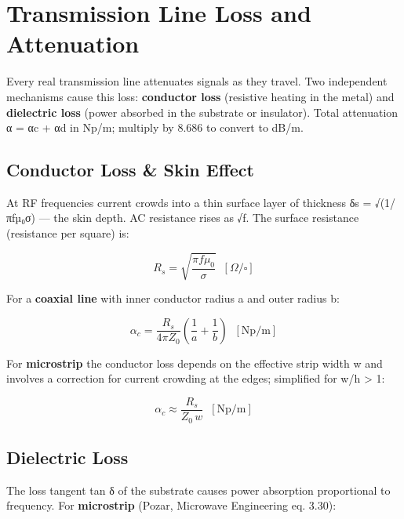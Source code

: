 \section{Transmission Line Loss and Attenuation}\label{sec:wiki_tl_loss}



Every real transmission line attenuates signals as they travel. Two independent mechanisms cause this loss: \textbf{conductor loss} (resistive heating in the metal) and \textbf{dielectric loss} (power absorbed in the substrate or insulator). Total attenuation α = αc + αd in Np/m; multiply by 8.686 to convert to dB/m.

				

\subsection{Conductor Loss \& Skin Effect}

				

At RF frequencies current crowds into a thin surface layer of thickness δs = √(1/πfµ₀σ) — the skin depth. AC resistance rises as √f. The surface resistance (resistance per square) is:

				
\[R_s = \sqrt{\dfrac{\pi f \mu_0}{\sigma}}\;\;[\Omega/\square]\]

				

For a \textbf{coaxial line} with inner conductor radius a and outer radius b:

				
\[\alpha_c = \dfrac{R_s}{4\pi Z_0}\!\left(\dfrac{1}{a}+\dfrac{1}{b}\right)\;\;[\text{Np/m}]\]

				

For \textbf{microstrip} the conductor loss depends on the effective strip width w and involves a correction for current crowding at the edges; simplified for w/h \textgreater{} 1:

				
\[\alpha_c \approx \dfrac{R_s}{Z_0\, w}\;\;[\text{Np/m}]\]

				

\subsection{Dielectric Loss}

				

The loss tangent tan δ of the substrate causes power absorption proportional to frequency. For \textbf{microstrip} (Pozar, Microwave Engineering eq. 3.30):

